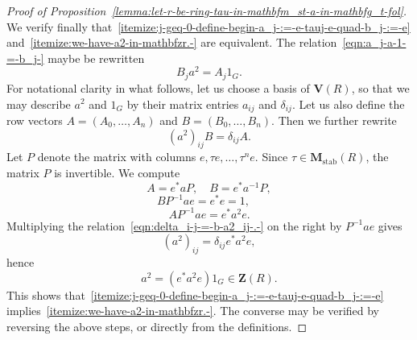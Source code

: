 \documentclass[reqno]{amsart}
\DeclareMathOperator{\stab}{stab}
\theoremstyle{plain} \newtheorem{theorem} {Theorem} \newtheorem{conjecture} {Conjecture} \newtheorem{corollary} [theorem] {Corollary} \newtheorem{proposition} [theorem] {Proposition} \newtheorem{fact} [theorem] {Fact}
\theoremstyle{definition} \newtheorem{definition} [theorem] {Definition}
\theoremstyle{itplain} %
\begin{document}
\begin{proof}[Proof of Proposition~\ref{lemma:let-r-be-ring-tau-in-mathbfm_st-a-in-mathbfg_t-fol}]
  We verify finally that~\eqref{itemize:j-geq-0-define-begin-a_j-:=-e-tauj-e-quad-b_j-:=-e} and~\eqref{itemize:we-have-a2-in-mathbfzr.-} are equivalent.  The relation~\eqref{eqn:a_j-a-1-=-b_j-} maybe be rewritten
  \begin{equation*}
    B_j a^2 = A_j 1_G.
  \end{equation*}
  For notational clarity in what follows, let us choose a basis of $\mathbf{V}(R)$, so that we may describe $a^2$ and $1_G$ by their matrix entries $a_{ij}$ and $\delta_{i j}$.  Let us also define the row vectors $A = (A _0, \dotsc, A _n )$ and $B = (B _0, \dotsc, B _n)$.  Then we further rewrite
  \begin{equation}\label{eqn:delta_i-j-=-b-a2_ij-.-} {(a^2)}_{ij } B = \delta_{i j} A.
  \end{equation}
  Let $P$ denote the matrix with columns $e, \tau e, \dotsc, \tau^n e$.  Since $\tau \in \mathbf{M}_{\stab}(R)$, the matrix $P$ is invertible.  We compute
  \begin{equation*}
    A = e^* a P, \quad  B = e^* a^{-1} P,
  \end{equation*}
  \begin{equation*}
    B P^{-1} a e = e^* e = 1, \quad 
  \end{equation*}
  \begin{equation*}
    A P^{-1} a e = e^* a^2 e.
  \end{equation*}
  Multiplying the relation~\eqref{eqn:delta_i-j-=-b-a2_ij-.-} on the right by $P^{-1} a e$ gives
  \begin{equation*} {(a^2)}_{i j} = \delta_{i j} e^* a^2 e,
  \end{equation*}
  hence
  \begin{equation*}
    a^2 = (e^* a^2 e) 1_G \in \mathbf{Z}(R).
  \end{equation*}
  This shows that~\eqref{itemize:j-geq-0-define-begin-a_j-:=-e-tauj-e-quad-b_j-:=-e} implies~\eqref{itemize:we-have-a2-in-mathbfzr.-}.  The converse may be verified by reversing the above steps, or directly from the definitions.
\end{proof}
\end{document}
